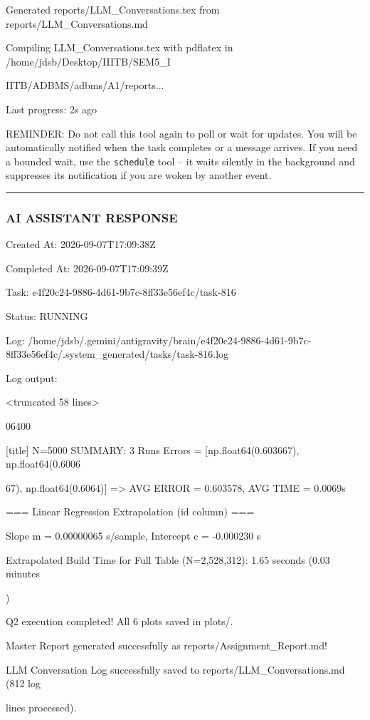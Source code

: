 \documentclass[11pt,a4paper]{article}
\begin{document}
Generated reports/LLM\_Conversations.tex from reports/LLM\_Conversations.md

Compiling LLM\_Conversations.tex with pdflatex in /home/jdsb/Desktop/IIITB/SEM5\_I

IITB/ADBMS/adbms/A1/reports...


Last progress: 2s ago



REMINDER: Do not call this tool again to poll or wait for updates. You will be automatically notified when the task completes or a message arrives. If you need a bounded wait, use the \texttt{schedule} tool -- it waits silently in the background and suppresses its notification if you are woken by another event.


\hrule

\subsubsection{AI ASSISTANT RESPONSE}

Created At: 2026-09-07T17:09:38Z

Completed At: 2026-09-07T17:09:39Z

Task: e4f20c24-9886-4d61-9b7c-8ff33e56ef4c/task-816

Status: RUNNING

Log: /home/jdsb/.gemini/antigravity/brain/e4f20c24-9886-4d61-9b7c-8ff33e56ef4c/.system\_generated/tasks/task-816.log

Log output:

<truncated 58 lines>

06400

[title] N=5000 SUMMARY: 3 Runs Errors = [np.float64(0.603667), np.float64(0.6006

67), np.float64(0.6064)] => AVG ERROR = 0.603578, AVG TIME = 0.0069s

=== Linear Regression Extrapolation (id column) ===

Slope m = 0.00000065 s/sample, Intercept c = -0.000230 s

Extrapolated Build Time for Full Table (N=2,528,312): 1.65 seconds (0.03 minutes

)

Q2 execution completed! All 6 plots saved in plots/.

Master Report generated successfully as reports/Assignment\_Report.md!

LLM Conversation Log successfully saved to reports/LLM\_Conversations.md (812 log

lines processed).
\end{document}
